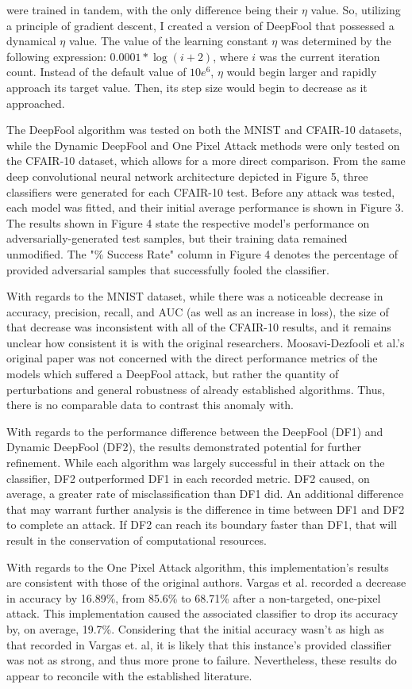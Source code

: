 \documentclass[../article.tex]{subfiles}
\begin{document}
\noindent were trained in tandem, with the only difference being their $\eta$ value. So, utilizing a principle of gradient descent, I created a version of DeepFool that possessed a dynamical $\eta$ value. The value of the learning constant $\eta$ was determined by the following expression: $0.0001 * \log(i + 2)$, where $i$ was the current iteration count. Instead of the default value of $10e^6$, $\eta$ would begin larger and rapidly approach its target value. Then, its step size would begin to decrease as it approached.

The DeepFool algorithm was tested on both the MNIST and CFAIR-10 datasets, while the Dynamic DeepFool and One Pixel Attack methods were only tested on the CFAIR-10 dataset, which allows for a more direct comparison. From the same deep convolutional neural network architecture depicted in Figure 5, three classifiers were generated for each CFAIR-10 test. Before any attack was tested, each model was fitted, and their initial average performance is shown in Figure 3. The results shown in Figure 4 state the respective model's performance on adversarially-generated test samples, but their training data remained unmodified. The "\% Success Rate" column in Figure 4 denotes the percentage of provided adversarial samples that successfully fooled the classifier.

With regards to the MNIST dataset, while there was a noticeable decrease in accuracy, precision, recall, and AUC (as well as an increase in loss), the size of that decrease was inconsistent with all of the CFAIR-10 results, and it remains unclear how consistent it is with the original researchers. Moosavi-Dezfooli et al.'s original paper was not concerned with the direct performance metrics of the models which suffered a DeepFool attack, but rather the quantity of perturbations and general robustness of already established algorithms. Thus, there is no comparable data to contrast this anomaly with. 

With regards to the performance difference between the DeepFool (DF1) and Dynamic DeepFool (DF2), the results demonstrated potential for further refinement. While each algorithm was largely successful in their attack on the classifier, DF2 outperformed DF1 in each recorded metric. DF2 caused, on average, a greater rate of misclassification than DF1 did. An additional difference that may warrant further analysis is the difference in time between DF1 and DF2 to complete an attack. If DF2 can reach its boundary faster than DF1, that will result in the conservation of computational resources.

With regards to the One Pixel Attack algorithm, this implementation's results are consistent with those of the original authors. Vargas et al. recorded a decrease in accuracy by 16.89\%, from 85.6\% to 68.71\% after a non-targeted, one-pixel attack. This implementation caused the associated classifier to drop its accuracy by, on average, 19.7\%. Considering that the initial accuracy wasn't as high as that recorded in Vargas et. al, it is likely that this instance's provided classifier was not as strong, and thus more prone to failure. Nevertheless, these results do appear to reconcile with the established literature.



\printbibliography
\end{document}
